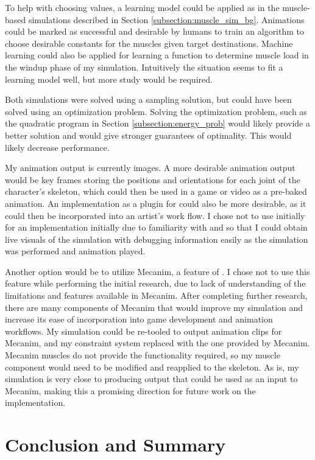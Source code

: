 To help with choosing values, a learning model could be applied as in the muscle-based simulations described in Section \ref{subsection:muscle_sim_bg}.  Animations could be marked as successful and desirable by humans to train an algorithm to choose desirable constants for the muscles given target destinations.  Machine learning could also be applied for learning a function to determine muscle load in the windup phase of my simulation.  Intuitively the situation seems to fit a learning model well, but more study would be required.

Both simulations were solved using a sampling solution, but could have been solved using an optimization problem.  Solving the optimization problem, such as the quadratic program in Section \ref{subsection:energy_prob} would likely provide a better solution and would give stronger guarantees of optimality.  This would likely decrease performance.

My animation output is currently images.  A more desirable animation output would be key frames storing the positions and orientations for each joint of the character's skeleton, which could then be used in a game or video as a pre-baked animation.  An implementation as a plugin for \maya{} could also be more desirable, as it could then be incorporated into an artist's work flow.  I chose not to use \maya{} initially for an implementation initially due to familiarity with \unity{} and so that I could obtain live visuals of the simulation with debugging information easily as the simulation was performed and animation played.

Another option would be to utilize Mecanim, a feature of \unity{}.  I chose not to use this feature while performing the initial research, due to lack of understanding of the limitations and features available in Mecanim.  After completing further research, there are many components of Mecanim that would improve my simulation and increase its ease of incorporation into game development and animation workflows.  My simulation could be re-tooled to output animation clips for Mecanim, and my constraint system replaced with the one provided by Mecanim.  Mecanim muscles do not provide the functionality required, so my muscle component would need to be modified and reapplied to the skeleton.  As is, my simulation is very close to producing output that could be used as an input to Mecanim, making this a promising direction for future work on the implementation.

\section{Conclusion and Summary}
\label{section:conclusion}

